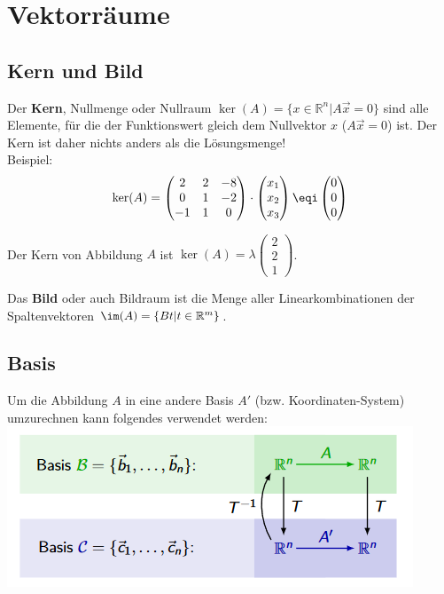 \section{Vektorräume}

\subsection{Kern und Bild}
Der \textbf{Kern}, Nullmenge oder Nullraum $\ker(A) = \{x \in \mathbb{R}^n | A\vec{x} = 0\}$ sind alle Elemente, für die der Funktionswert gleich dem Nullvektor $x$ ($A\vec{x} = 0$) ist. Der Kern ist daher nichts anders als die Lösungsmenge! \\
Beispiel:
\[
	\ker(A) = \begin{pmatrix}
		2 & 2 & -8\\
		0 & 1 &-2 \\
		-1 & 1 & 0
	\end{pmatrix} \cdot \begin{pmatrix}
		x_1\\
		x_2\\
		x_3
	\end{pmatrix} \eqi \begin{pmatrix}
		0\\
		0\\ 
    	0
\end{pmatrix} 
\]

\noindent Der Kern von Abbildung $A$ ist $\ker(A) = \lambda\begin{pmatrix}2 \\ 2 \\ 1\end{pmatrix}$.

\noindent Das \textbf{Bild} oder auch Bildraum ist die Menge aller Linearkombinationen der Spaltenvektoren $\im(A) = \{Bt | t \in \mathbb{R}^m\}$.


\subsection{Basis}
Um die Abbildung $A$ in eine andere Basis $A'$ (bzw. Koordinaten-System) umzurechnen kann folgendes verwendet werden: \\
\includegraphics[width=\columnwidth]{./Images/Basiswechsel.png}

